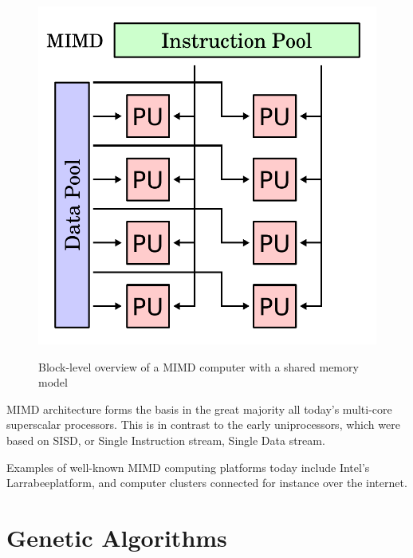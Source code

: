 \begin{figure}[H]
\begin{center}
    \includegraphics[width=\textwidth/2]{fig/mimd-block-diagram.pdf}
    \label{figure:mimd-block-diagram}
    \caption{Block-level overview of a MIMD computer with a shared memory model}
\end{center}
\end{figure}

MIMD architecture forms the basis in the great majority all today’s multi-core superscalar processors.
This is in contrast to the early uniprocessors, which were based on SISD, or Single Instruction stream, Single Data stream. 


Examples of well-known MIMD computing platforms today include Intel's Larrabee\cn platform, and computer clusters connected for instance over the internet.




\section{Genetic Algorithms}

